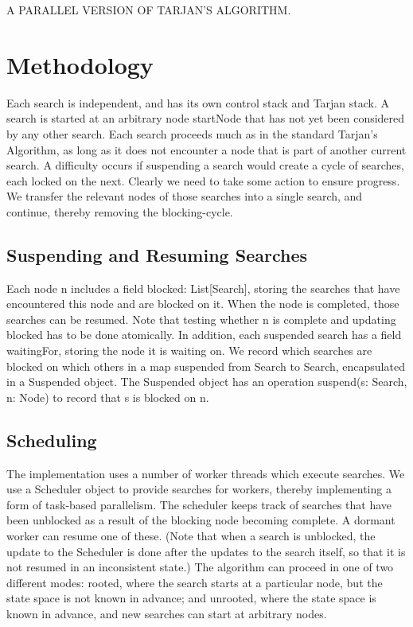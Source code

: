 \documentclass[14pt]{article}
\begin{document}
\begin{center}\begin{small}A PARALLEL VERSION OF TARJAN’S ALGORITHM.\end{small}\end{center}
\section{Methodology}{Each search is independent, and has its own control stack and Tarjan stack. A search is started at an arbitrary node startNode that has not yet been considered by any other search. Each search proceeds much as in the standard Tarjan’s Algorithm, as long as it does not encounter a node that is part of another current search. A difficulty occurs if suspending a search would create a cycle of searches, each locked on the next. Clearly we need to take some action to ensure progress. We transfer the relevant nodes of those searches into a single search, and continue, thereby removing the blocking-cycle.}


\subsection{Suspending and Resuming Searches}{Each node n includes a field blocked: List[Search], storing the searches that have encountered this node and are blocked on it. When the node is completed, those searches can be resumed. Note that testing whether n is complete and updating blocked has to be done atomically. In addition, each suspended search has a field waitingFor, storing the node it is waiting on. We record which searches are blocked on which others in a map suspended from Search to Search, encapsulated in a Suspended object. The Suspended object has an operation suspend(s: Search, n: Node) to record that s is blocked on n.}

\subsection{Scheduling}{The implementation uses a number of worker threads which execute searches. We use a Scheduler object to provide searches for workers, thereby implementing a form of task-based parallelism. The scheduler keeps track of searches that have been unblocked as a result of the blocking node becoming complete. A dormant worker can resume one of these. (Note that when a search is unblocked, the update to the Scheduler is done after the updates to the search itself, so that it is not resumed in an inconsistent state.) The algorithm can proceed in one of two different modes: rooted, where the search starts at a particular node, but the state space is not known in advance; and unrooted, where the state space is known in advance, and new searches can start at arbitrary nodes.}\cite{ref4}
\end{document}
